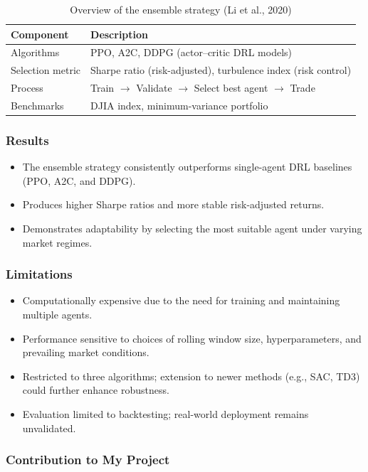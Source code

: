\documentclass[12pt,a4paper]{report}
\begin{document}
\begin{table}[h]
\centering
\caption{Overview of the ensemble strategy (Li et al., 2020)}
\begin{tabular}{p{4cm} p{8.5cm}}
\toprule
\textbf{Component} & \textbf{Description} \\
\midrule
Algorithms & PPO, A2C, DDPG (actor–critic DRL models) \\
Selection metric & Sharpe ratio (risk-adjusted), turbulence index (risk control) \\
Process & Train $\rightarrow$ Validate $\rightarrow$ Select best agent $\rightarrow$ Trade \\
Benchmarks & DJIA index, minimum-variance portfolio \\
\bottomrule
\end{tabular}
\end{table}

\subsubsection{Results}
\begin{itemize}
    \item The ensemble strategy consistently outperforms single-agent DRL baselines (PPO, A2C, and DDPG).  
    \item Produces higher Sharpe ratios and more stable risk-adjusted returns.  
    \item Demonstrates adaptability by selecting the most suitable agent under varying market regimes.  
\end{itemize}

\subsubsection{Limitations}
\begin{itemize}
    \item Computationally expensive due to the need for training and maintaining multiple agents.  
    \item Performance sensitive to choices of rolling window size, hyperparameters, and prevailing market conditions.  
    \item Restricted to three algorithms; extension to newer methods (e.g., SAC, TD3) could further enhance robustness.  
    \item Evaluation limited to backtesting; real-world deployment remains unvalidated.  
\end{itemize}

\subsubsection{Contribution to My Project}
\end{document}
